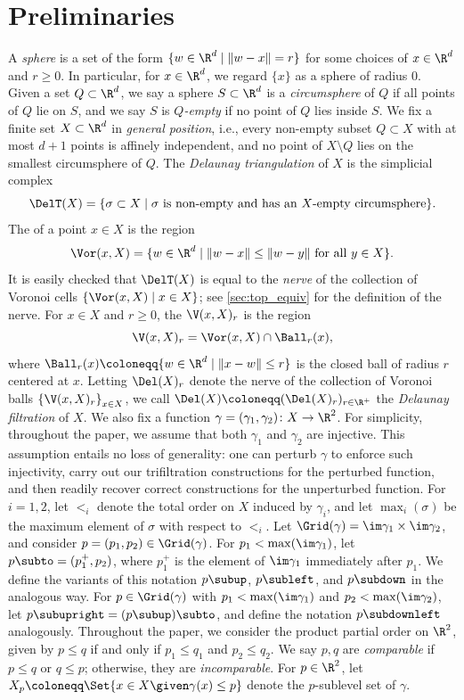 \section{Preliminaries}\label{Sec:Preliminaries}
A \emph{sphere} is a set of the form $\{w\in \R^d\mid \|w-x\|=r\}$ for some choices of $x\in \R^d$ and $r\geq 0$.  In particular, for $x\in \R^d$, we regard $\{x\}$ as a sphere of radius 0.
Given a set $Q\subset \R^d$, we say a sphere $S\subset \R^d$ is a \emph{circumsphere} of $Q$ if all points of $Q$ lie on $S$, and we say  $S$ is \emph{$Q$-empty} if no point of $Q$ lies inside $S$.  
%
We fix a finite set $X\subset\R^{d}$ in \emph{general position}, i.e., every non-empty subset $Q \subset X$ with at most $d+1$ points is affinely
independent, and no point of $X \setminus Q$ lies on the smallest circumsphere
of $Q$.  The \emph{Delaunay triangulation} of $X$ is the simplicial complex \[\DelT(X)=\{\sigma\subset X\mid \sigma \textup{ is non-empty and has an $X$-empty circumsphere}\}.\]  
  The  of a point $x\in X$ is the region
  \[\Vor(x, X) = \{w \in \R^d \mid  \|w - x\| \leq \|w - y\| \textup{ for all } y\in X\}.\]
It is easily checked that $\DelT(X)$ is equal to the \emph{nerve} of the collection of Voronoi cells $\left\{\Vor(x, X) \mid x\in X \right\}$; see \cref{sec:top_equiv} for the definition of the nerve.  
%
For $x\in X$ and $r\geq 0$, the  $\V(x,X)_r$ is the region
 \[\V(x,X)_r = \Vor(x, X) \cap \Ball_r(x),\]
 where $\Ball_r(x)\coloneqq \{w\in \R^d \mid \|x-w\|\leq r\}$ is the closed ball of radius $r$ centered at $x$.     
Letting $\Del(X)_r$ denote the nerve of the collection of Voronoi balls $\left\{\V(x,X)_r \right\}_{x\in X}$, we call $\Del(X)\coloneqq (\Del(X)_r)_{r\in \R^+}$ the \emph{Delaunay filtration} of $X$.  
%
%
%
We also fix a function $\gamma = (\gamma_1, \gamma_2) \colon X\to \R^{2}$. 
For simplicity, throughout the paper, we assume that both $\gamma_1$ and $\gamma_2$ are injective.  
This assumption entails no loss of generality: one can perturb $\gamma$ to enforce such injectivity, carry out our trifiltration constructions for the perturbed function, and then readily recover correct constructions for the unperturbed function. %
For $i=1,2$, let $<_i$ denote the total order on $X$ induced by $\gamma_{i}$, and  %
let $\max_{i}(\sigma)$ be  the maximum element of $\sigma$ with respect to $<_i$.
%
Let $\Grid(\gamma)=\im \gamma_1\times \im \gamma_2$, and consider $p=(p_1, p_2)\in \Grid(\gamma)$.  For $p_1<\max(\im \gamma_1)$, let $p{\subto}=(p_1^+,p_2)$, where $p_1^+$ is the element of $\im \gamma_1$ immediately after $p_1$.  
We define the variants of this notation $p{\subup}$, $p{\subleft}$, and $p{\subdown}$ in the analogous way.  For $p\in \Grid(\gamma)$ with $p_1<\max(\im \gamma_1)$ and $p_2<\max(\im \gamma_2)$, let $p{\subupright}=(p{\subup}){\subto}$, and define the notation $p{\subdownleft}$ analogously.
%
Throughout the paper, we consider the product partial order on $\R^2$, given by $p\leq q$ if and only if $p_1\leq q_1$ and $p_2\leq q_2$.  We say $p,q$ are \emph{comparable} if $p \leq q$ or $q \leq p$; otherwise, they are \emph{incomparable}.  For $p\in\R^{2}$, let $X_{p}\coloneqq \Set{x\in X\given \gamma(x) \leq p}$ denote the $p$-sublevel set of $\gamma$.
%
